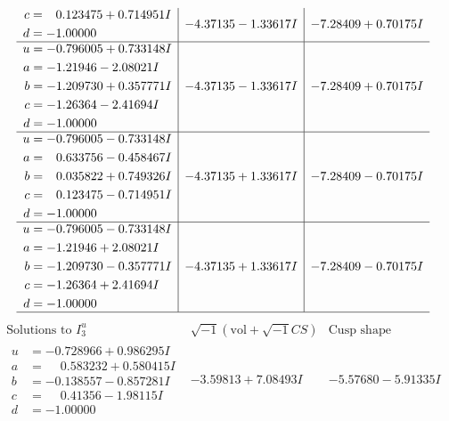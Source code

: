 \documentclass[1p]{elsarticle_modified}
\theoremstyle{definition}
\newcommand{\I}{\sqrt{-1}}
\begin{document}
$$\begin{array}{c|c|c}
\begin{aligned}
c &= \phantom{-}0.123475 + 0.714951 I \\
d &= -1.00000\phantom{ +0.000000I}\end{aligned}
 & -4.37135 - 1.33617 I & -7.28409 + 0.70175 I \\ \hline\begin{aligned}
u &= -0.796005 + 0.733148 I \\
a &= -1.21946 - 2.08021 I \\
b &= -1.209730 + 0.357771 I \\
c &= -1.26364 - 2.41694 I \\
d &= -1.00000\phantom{ +0.000000I}\end{aligned}
 & -4.37135 - 1.33617 I & -7.28409 + 0.70175 I \\ \hline\begin{aligned}
u &= -0.796005 - 0.733148 I \\
a &= \phantom{-}0.633756 - 0.458467 I \\
b &= \phantom{-}0.035822 + 0.749326 I \\
c &= \phantom{-}0.123475 - 0.714951 I \\
d &= -1.00000\phantom{ +0.000000I}\end{aligned}
 & -4.37135 + 1.33617 I & -7.28409 - 0.70175 I \\ \hline\begin{aligned}
u &= -0.796005 - 0.733148 I \\
a &= -1.21946 + 2.08021 I \\
b &= -1.209730 - 0.357771 I \\
c &= -1.26364 + 2.41694 I \\
d &= -1.00000\phantom{ +0.000000I}\end{aligned}
 & -4.37135 + 1.33617 I & -7.28409 - 0.70175 I\\
 \hline 
 \end{array}$$\newpage$$\begin{array}{c|c|c}  
\text{Solutions to }I^u_{3}& \I (\text{vol} + \sqrt{-1}CS) & \text{Cusp shape}\\
 \hline 
\begin{aligned}
u &= -0.728966 + 0.986295 I \\
a &= \phantom{-}0.583232 + 0.580415 I \\
b &= -0.138557 - 0.857281 I \\
c &= \phantom{-}0.41356 - 1.98115 I \\
d &= -1.00000\phantom{ +0.000000I}\end{aligned}
 & -3.59813 + 7.08493 I & -5.57680 - 5.91335 I \\ \hline\begin{aligned}

\end{aligned}
\end{array}$$
\end{document}
